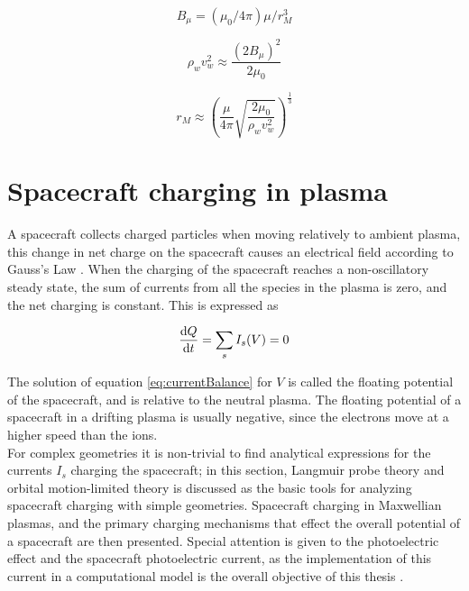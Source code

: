 \begin{equation}\label{eq:magFieldStrength}
    B_{\mu} = (\mu_0 / 4 \pi) \mu / r^3_M
\end{equation}



\begin{equation}\label{eq:pressureBalance}
    \rho_w v^2_w \approx \frac{(2 B_{\mu})^2}{2 \mu_0} 
\end{equation}


\begin{equation}
    r_M \approx \left(\frac{\mu}{4 \pi} \sqrt{\frac{2 \mu_0}{\rho_w v^2_w}} \right)^{\frac{1}{3}}
\end{equation}

\section{Spacecraft charging in plasma}
A spacecraft collects charged particles when moving relatively to ambient plasma, this change in net charge on the spacecraft causes an electrical field according to Gauss's Law . When the charging of the spacecraft reaches a non-oscillatory steady state, the sum of currents from all the species in the plasma is zero, and the net charging is constant. This is expressed as 

\begin{equation} \label{eq:currentBalance}
    \dv{Q}{t} = \sum_s I_s(V) = 0
\end{equation}

The solution of equation \ref{eq:currentBalance} for $V$ is called the floating potential of the spacecraft, and is relative to the neutral plasma. The floating potential of a spacecraft in a drifting plasma is usually negative, since the electrons move at a higher speed than the ions.
\\
For complex geometries it is non-trivial to find analytical expressions for the currents $I_s$ charging the spacecraft; in this section, Langmuir probe theory and orbital motion-limited theory is discussed as the basic tools for analyzing spacecraft charging with simple geometries. Spacecraft charging in Maxwellian plasmas, and the primary charging mechanisms that effect the overall potential of a spacecraft are then presented. Special attention is given to the photoelectric effect and the spacecraft photoelectric current, as the implementation of this current in a computational model is the overall objective of this thesis .


